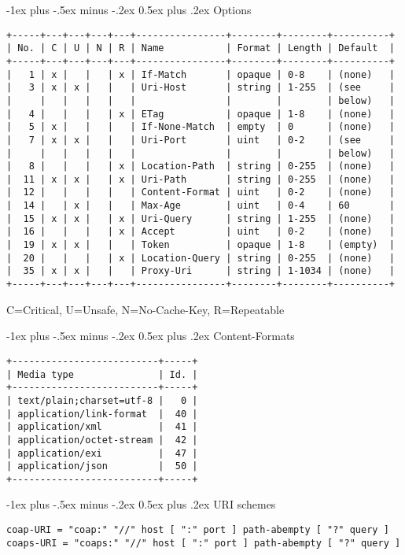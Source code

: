\documentclass[10pt,landscape]{article}
\makeatletter
\renewcommand{\section}{\@startsection{section}{1}{0mm}%
                                {-1ex plus -.5ex minus -.2ex}%
                                {0.5ex plus .2ex}%
                                {\normalfont\large\bfseries}}
\makeatother
\begin{document}
\begin{multicols}{3}
\section{Options}
{\tiny
\begin{verbatim}
+-----+---+---+---+---+----------------+--------+--------+----------+
| No. | C | U | N | R | Name           | Format | Length | Default  |
+-----+---+---+---+---+----------------+--------+--------+----------+
|   1 | x |   |   | x | If-Match       | opaque | 0-8    | (none)   |
|   3 | x | x |   |   | Uri-Host       | string | 1-255  | (see     |
|     |   |   |   |   |                |        |        | below)   |
|   4 |   |   |   | x | ETag           | opaque | 1-8    | (none)   |
|   5 | x |   |   |   | If-None-Match  | empty  | 0      | (none)   |
|   7 | x | x |   |   | Uri-Port       | uint   | 0-2    | (see     |
|     |   |   |   |   |                |        |        | below)   |
|   8 |   |   |   | x | Location-Path  | string | 0-255  | (none)   |
|  11 | x | x |   | x | Uri-Path       | string | 0-255  | (none)   |
|  12 |   |   |   |   | Content-Format | uint   | 0-2    | (none)   |
|  14 |   | x |   |   | Max-Age        | uint   | 0-4    | 60       |
|  15 | x | x |   | x | Uri-Query      | string | 1-255  | (none)   |
|  16 |   |   |   | x | Accept         | uint   | 0-2    | (none)   |
|  19 | x | x |   |   | Token          | opaque | 1-8    | (empty)  |
|  20 |   |   |   | x | Location-Query | string | 0-255  | (none)   |
|  35 | x | x |   |   | Proxy-Uri      | string | 1-1034 | (none)   |
+-----+---+---+---+---+----------------+--------+--------+----------+
\end{verbatim}
C=Critical, U=Unsafe, N=No-Cache-Key, R=Repeatable
}

\section{Content-Formats}
{\tiny
\begin{verbatim}
+--------------------------+-----+
| Media type               | Id. |
+--------------------------+-----+
| text/plain;charset=utf-8 |   0 |
| application/link-format  |  40 |
| application/xml          |  41 |
| application/octet-stream |  42 |
| application/exi          |  47 |
| application/json         |  50 |
+--------------------------+-----+
\end{verbatim}
}

\section{URI schemes}
{\tiny
\begin{verbatim}
coap-URI = "coap:" "//" host [ ":" port ] path-abempty [ "?" query ]
coaps-URI = "coaps:" "//" host [ ":" port ] path-abempty [ "?" query ]
\end{verbatim}
}


\end{multicols}
\end{document}
